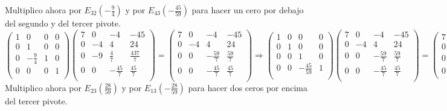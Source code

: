 \documentclass[11pt, a4paper]{article}
\newif\IfInSansMode
\theoremstyle{theorem-style}
\theoremstyle{definition-style}
\theoremstyle{remark-style}
\theoremstyle{example-style}
\begin{document}
Multiplico ahora por $E_{32}(-\frac{9}{4})$ y por $E_{43}(-\frac{45}{59})$ para hacer un cero por debajo del segundo y del tercer pivote. \\

$\begin{pmatrix}
	1 & 0 & 0 & 0\\
	0 & 1 & 0 & 0\\
	0 & -\frac{9}{4} & 1 & 0\\
	0 & 0 & 0 & 1 \\
\end{pmatrix}
\begin{pmatrix}
	7 & 0 & -4 & -45 \\
	0 & -4 & 4 & 24 \\
	0 & -9 & \frac{4}{7} & \frac{437}{7} \\
	0 & 0 & -\frac{45}{7} & \frac{45}{7} \\
\end{pmatrix} = 
\begin{pmatrix}
	7 & 0 & -4 & -45 \\
	0 & -4 & 4 & 24 \\
	0 & 0 & -\frac{59}{7} & \frac{59}{7} \\
	0 & 0 & -\frac{45}{7} & \frac{45}{7} \\
\end{pmatrix} \Longrightarrow
\begin{pmatrix}
1 & 0 & 0 & 0\\
0 & 1 & 0 & 0\\
0 & 0 & 1 & 0\\
0 & 0 & -\frac{45}{59} & 1 \\
\end{pmatrix} 
\begin{pmatrix}
7 & 0 & -4 & -45 \\
0 & -4 & 4 & 24 \\
0 & 0 & -\frac{59}{7} & \frac{59}{7} \\
0 & 0 & -\frac{45}{7} & \frac{45}{7} \\
\end{pmatrix} = 
\begin{pmatrix}
7 & 0 & -4 & -45 \\
0 & -4 & 4 & 24 \\
0 & 0 & -\frac{59}{7} & \frac{59}{7} \\
0 & 0 & 0 & 0 \\
\end{pmatrix}$ \\

Multiplico ahora por $E_{23}(\frac{28}{59})$ y por $E_{13}(-\frac{28}{59})$ para hacer dos ceros por encima del tercer pivote. \\
\end{document}
